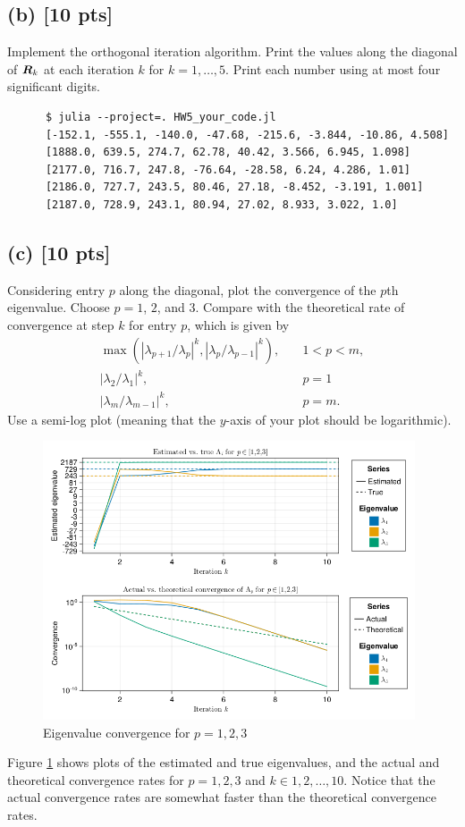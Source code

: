 \documentclass[twoside,10pt]{article}
\begin{document}
  \subsection*{(b) [10 pts]}
    Implement the orthogonal iteration algorithm. Print the values along the diagonal of $\bm{R}_{k}$ at each iteration $k$ for $k = 1, \ldots,5$. Print each number using at most four significant digits.
    
    \begin{verbatim}
      $ julia --project=. HW5_your_code.jl
      [-152.1, -555.1, -140.0, -47.68, -215.6, -3.844, -10.86, 4.508]
      [1888.0, 639.5, 274.7, 62.78, 40.42, 3.566, 6.945, 1.098]
      [2177.0, 716.7, 247.8, -76.64, -28.58, 6.24, 4.286, 1.01]
      [2186.0, 727.7, 243.5, 80.46, 27.18, -8.452, -3.191, 1.001]
      [2187.0, 728.9, 243.1, 80.94, 27.02, 8.933, 3.022, 1.0]
    \end{verbatim}
  \subsection*{(c) [10 pts]}
    Considering entry $p$ along the diagonal, plot the convergence of the $p$th eigenvalue. 
    Choose $p = 1$, $2$, and $3$.  
    Compare with the theoretical rate of convergence at step $k$ for entry $p$, which is given by 
    \begin{align}
      \max(|\lambda_{p + 1} / \lambda_p|^k, |\lambda_p / \lambda_{p -1}|^k), \quad &1 < p < m,\\
      |\lambda_2 / \lambda_1|^k, \quad &p = 1\\
      |\lambda_{m} / \lambda_{m -1}|^k, \quad &p = m.
    \end{align}
    Use a semi-log plot (meaning that the $y$-axis of your plot should be logarithmic). 

    \begin{figure}[htb]
      \begin{center}
      \includegraphics[width=110mm]{HW5_code/convergence_final.png}
      \end{center}
      \caption{Eigenvalue convergence for $p = 1, 2, 3$}
      \label{fig:figure1}
    \end{figure}
    Figure \ref{fig:figure1} shows plots of the estimated and true eigenvalues, and the actual and theoretical convergence rates for $p = 1, 2, 3$ and $k \in 1, 2, \dots, 10$.
    Notice that the actual convergence rates are somewhat faster than the theoretical convergence rates.
\end{document}
